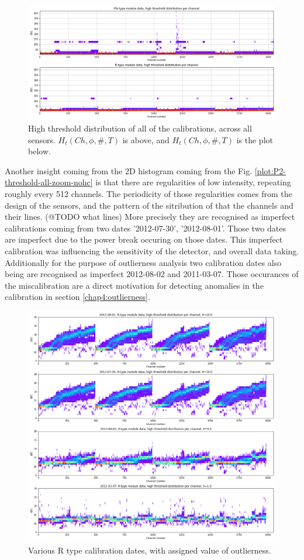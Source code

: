 \begin{figure}
    \centering
    \includegraphics[width=0.7\linewidth]{figures/chapter4/calib_analysis/P2-threshold-all-r-phi.png}
    \caption{High threshold distribution of all of the calibrations, across all sensors. $H_t(Ch,\phi,\#, T)$ is above, and $H_t(Ch,\phi,\#, T)$ is the plot below.}
    \label{plot:part2-threshold-all}
\end{figure}

Another insight coming from the 2D histogram coming from the Fig. \ref{plot:P2-threshold-all-zoom-nohc} is that there are regularities of low intensity, repeating roughly every 512 channels. The periodicity of those regularities comes from the design of the sensors, and the pattern of the sitribution of that the channels and their lines.
(@TODO what lines)
More precisely they are recognised as imperfect calibrations coming from two dates  '2012-07-30', '2012-08-01'.
Those two dates are imperfect due to the power break occuring on those dates.
This imperfect calibration was influencing the sensitivity of the detector, and overall data taking.
Additionally for the purpose of outlierness analysis two calibration dates also being are recognised as imperfect 2012-08-02 and 2011-03-07.
Those occurances of the miscalibration are a direct motivation for detecting anomalies in the calibration in section \ref{chap4:outlierness}.


\begin{figure}
    \centering
    \includegraphics[width=0.6\linewidth]{figures/chapter4/calib_analysis/P2-all-bad-cals-R.png}
    \caption{Various R type calibration dates, with assigned value of outlierness.}
    \label{plot:all-bad-r}
\end{figure}


